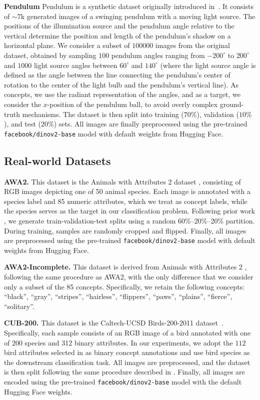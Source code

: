 \documentclass{article}
\theoremstyle{plain}
\theoremstyle{definition}
\theoremstyle{remark}
\newcommand{\mypar}[1]{\noindent\textbf{#1}}
\begin{document}
\mypar{Pendulum} Pendulum is a synthetic dataset originally introduced in~\citet{yang2020}. It consists of $\sim$7k generated images of a swinging pendulum with a moving light source. The positions of the illumination source and the pendulum angle relative to the vertical determine the position and length of the pendulum’s shadow on a horizontal plane. We consider a subset of $100000$ images from the original dataset, obtained by sampling $100$ pendulum angles ranging from $-200^\circ$ to $200^\circ$ and $1000$ light source angles between $60^\circ$ and $140^\circ$ (where the light source angle is defined as the angle between the line connecting the pendulum’s center of rotation to the center of the light bulb and the pendulum’s vertical line). As concepts, we use the radiant representation of the angles, and as a target, we consider the $x$-position of the pendulum ball, to avoid overly complex ground-truth mechanisms. The dataset is then split into training ($70\%$), validation ($10\%$), and test ($20\%$) sets.
All images are finally preprocessed using the pre-trained \texttt{facebook/dinov2-base} model with default weights from Hugging Face.

\subsection{Real-world Datasets}

\mypar{AWA2. } This dataset is the Animals with Attributes 2 dataset \citep{xian2017}, consisting of RGB images depicting one of 50 animal species. Each image is annotated with a species label and 85 numeric attributes, which we treat as concept labels, while the species serves as the target in our classification problem. Following prior work \citep{alaa2019demystifying}, we generate train-validation-test splits using a random 60\%–20\%–20\% partition. During training, samples are randomly cropped and flipped. Finally, all images are preprocessed using the pre-trained \texttt{facebook/dinov2-base} model with default weights from Hugging Face.


\mypar{AWA2-Incomplete. } This dataset is derived from Animals with Attributes 2 \citep{xian2017}, following the same procedure as AWA2, with the only difference that we consider only a subset of the 85 concepts. Specifically, we retain the following concepts: ``black'', ``gray'', ``stripes'', ``hairless'', ``flippers'', ``paws'', ``plains'', ``fierce'', ``solitary''.

\mypar{CUB-200. } This dataset is  the Caltech-UCSD Birds-200-2011 dataset~\citep{he2019fine}. 
Specifically, each sample consists of an RGB image of a bird annotated with one of 200 species and 312 binary attributes. In our experiments, we adopt the $112$ bird attributes selected in \citep{koh2020concept} as binary concept annotations and use bird species as the downstream classification task. All images are preprocessed, and the dataset is then split following the same procedure described in \citet{zarlenga2022concept}. Finally, all images are encoded using the pre-trained \texttt{facebook/dinov2-base} model with the default Hugging Face weights.
\end{document}
